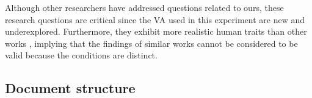 Although other researchers have addressed questions related to ours, these research questions are critical since the VA used in this experiment are new and underexplored. Furthermore, they exhibit more realistic human traits than other works \cite{LU21, ZAL18, GRA07, LUC14, ROT19, KAN16, KAN10A, BAC19}, implying that the findings of similar works cannot be considered to be valid because the conditions are distinct.

\subsection{Document structure}




